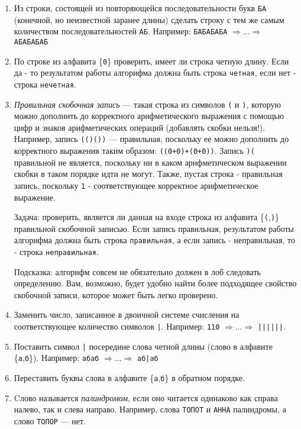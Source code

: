 \documentclass[12pt,a4paper,oneside]{article}
\newcommand{\s}[1]{\texttt{#1}}
\begin{document}
\begin{enumerate}
\item Из строки, состоящей из повторяющейся последовательности букв \s{БА}
(конечной, но неизвестной заранее длины) сделать строку с тем же самым
количеством последовательностей \s{АБ}.
Например: \s{БАБАБАБА} $\Rightarrow\dots\Rightarrow$ \s{АБАБАБАБ}

\item По строке из алфавита \{\s{0}\} проверить, имеет ли строка четную длину.
Если да - то результатом работы алгорифма должна быть строка \s{четная}, если
нет - строка \s{нечетная}.

\item \emph{Правильная скобочная запись} --- такая строка из 
символов \s{(} и \s{)}, которую можно дополнить до корректного 
арифметического выражения с помощью цифр и знаков арифметических операций 
(добавлять скобки нельзя!). 
Например, запись \s{(()())} --- правильная, поскольку 
ее можно дополнить до корректного выражения таким образом: 
\s{((0+0)+(0+0))}. Запись \s{)(} правильной не является, поскольку 
ни в каком арифметическом выражении скобки в таком порядке идти не могут. 
Также, пустая строка - правильная запись, поскольку \s{1} - соответствующее 
корректное арифметическое выражение. 

Задача: проверить, является ли данная на входе строка из алфавита \{\s{(},\s{)}\}
правильной скобочной записью. Если запись правильная, результатом работы 
алгорифма должна быть строка \s{правильная}, а если запись - неправильная, 
то - строка \s{неправильная}.

Подсказка: алгорифм совсем не обязательно должен в лоб следовать 
определению. Вам, возможно, будет удобно найти более подходящее свойство скобочной 
записи, которое может быть легко проверено.

\item Заменить число, записанное в двоичной системе счисления на 
соответствующее количество символов \s{|}. Например: 
\s{110} $\Rightarrow\dots\Rightarrow$ \s{||||||}.

\item Поставить символ \s{|} посередине слова четной длины (слово в алфавите
\{\s{а},\s{б}\}). 
Например: \s{абаб} $\Rightarrow\dots\Rightarrow$ \s{аб|аб}

\item Переставить буквы слова в алфавите \{\s{а},\s{б}\} в обратном порядке.

\item Cлово называется \emph{палиндромом}, если оно читается одинаково
как справа налево, так и слева направо. Например, слова \s{ТОПОТ} и 
\s{АННА} палиндромы, а слово \s{ТОПОР} --- нет. 


\end{enumerate}
\end{document}
